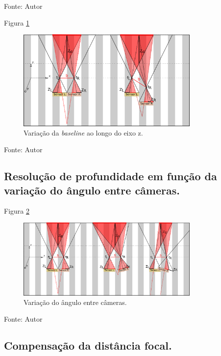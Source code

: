 Fonte: Autor

Figura \ref{fig:stereo_vision_bz_variation}

\begin{figure}[!htb]
  \centering
  \caption{Variação da \textit{baseline} ao longo do eixo z.}
  \label{fig:stereo_vision_bz_variation}
  \includegraphics[width=0.80\textwidth]{./img/fundamentacao/stereo_vision_bz_variation.png}
\end{figure}

Fonte: Autor

\pagebreak

\subsection{Resolução de profundidade em função da variação do ângulo entre câmeras.}

Figura \ref{fig:stereo_vision_arc_variation}

\begin{figure}[!htb]
  \centering
  \caption{Variação do ângulo entre câmeras.}
  \label{fig:stereo_vision_arc_variation}
  \includegraphics[width=0.80\textwidth]{./img/fundamentacao/stereo_vision_arc_variation.png}
\end{figure}
Fonte: Autor

\pagebreak

\subsection{Compensação da distância focal.}

